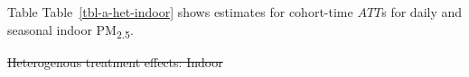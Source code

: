 \documentclass[
  letterpaper,
  DIV=11,
  numbers=noendperiod]{scrartcl}
\makeatletter
\renewenvironment{table}%
   {\renewcommand\familydefault\sfdefault
    \@float{table}}
   {\end@float}
\providecommand{\DIFdel}[1]{{\protect\color{red}\sout{#1}}}                      %
\providecommand{\DIFdelbegin}{} %
\providecommand{\DIFdelend}{} %
\providecommand{\DIFdelFL}[1]{\DIFdel{#1}} %
\newcommand{\DIFscaledelfig}{0.5}
\newlength{\DIFdelgraphicswidth} %
\newlength{\DIFdelgraphicsheight} %
\newcommand{\DIFdelincludegraphics}[2][]{%
\sbox{\DIFdelgraphicsbox}{\DIFOincludegraphics[#1]{#2}}%
\settoboxwidth{\DIFdelgraphicswidth}{\DIFdelgraphicsbox} %
\settoboxtotalheight{\DIFdelgraphicsheight}{\DIFdelgraphicsbox} %
\scalebox{\DIFscaledelfig}{%
\parbox[b]{\DIFdelgraphicswidth}{\usebox{\DIFdelgraphicsbox}\\[-\baselineskip] \rule{\DIFdelgraphicswidth}{0em}}\llap{\resizebox{\DIFdelgraphicswidth}{\DIFdelgraphicsheight}{%
\setlength{\unitlength}{\DIFdelgraphicswidth}%
\begin{picture}(1,1)%
\thicklines\linethickness{2pt} %
{\color[rgb]{1,0,0}\put(0,0){\framebox(1,1){}}}%
{\color[rgb]{1,0,0}\put(0,0){\line( 1,1){1}}}%
{\color[rgb]{1,0,0}\put(0,1){\line(1,-1){1}}}%
\end{picture}%
}\hspace*{3pt}}} %
} %
\DeclareRobustCommand{\DIFdelbegin}{\DIFOdelbegin \let\includegraphics\DIFdelincludegraphics} %
\DeclareRobustCommand{\DIFdelend}{\DIFOaddend \let\includegraphics\DIFOincludegraphics} %
\makeatother
\begin{document}

\DIFdelend Table Table~\ref{tbl-a-het-indoor} shows estimates for cohort-time
\(ATT\)s for daily and seasonal indoor PM\textsubscript{2.5}.

\DIFdelbegin %
{%
\DIFdelFL{Heterogenous treatment effects: Indoor }}%
\end{document}
